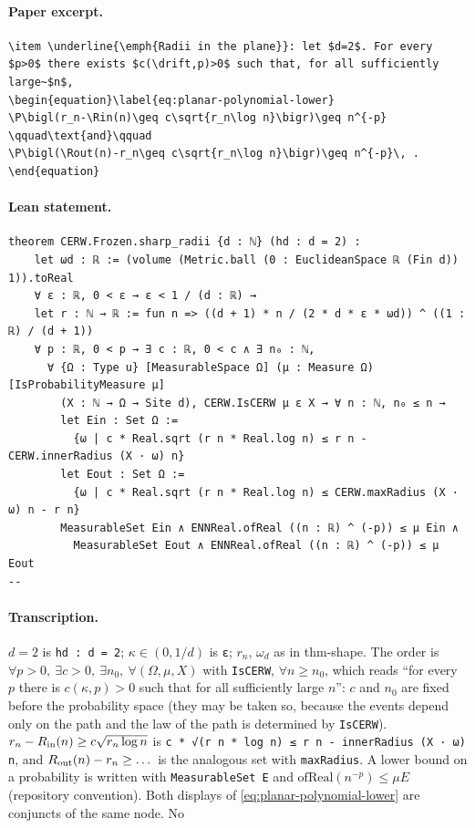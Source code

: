 \paragraph{Paper excerpt.}
\begin{verbatim}
\item \underline{\emph{Radii in the plane}}: let $d=2$. For every $p>0$ there exists $c(\drift,p)>0$ such that, for all sufficiently large~$n$,
\begin{equation}\label{eq:planar-polynomial-lower}
\P\bigl(r_n-\Rin(n)\geq c\sqrt{r_n\log n}\bigr)\geq n^{-p}
\qquad\text{and}\qquad
\P\bigl(\Rout(n)-r_n\geq c\sqrt{r_n\log n}\bigr)\geq n^{-p}\, .
\end{equation}
\end{verbatim}
\paragraph{Lean statement.}
\begin{verbatim}
theorem CERW.Frozen.sharp_radii {d : ℕ} (hd : d = 2) :
    let ωd : ℝ := (volume (Metric.ball (0 : EuclideanSpace ℝ (Fin d)) 1)).toReal
    ∀ ε : ℝ, 0 < ε → ε < 1 / (d : ℝ) →
    let r : ℕ → ℝ := fun n => ((d + 1) * n / (2 * d * ε * ωd)) ^ ((1 : ℝ) / (d + 1))
    ∀ p : ℝ, 0 < p → ∃ c : ℝ, 0 < c ∧ ∃ n₀ : ℕ,
      ∀ {Ω : Type u} [MeasurableSpace Ω] (μ : Measure Ω) [IsProbabilityMeasure μ]
        (X : ℕ → Ω → Site d), CERW.IsCERW μ ε X → ∀ n : ℕ, n₀ ≤ n →
        let Ein : Set Ω :=
          {ω | c * Real.sqrt (r n * Real.log n) ≤ r n - CERW.innerRadius (X · ω) n}
        let Eout : Set Ω :=
          {ω | c * Real.sqrt (r n * Real.log n) ≤ CERW.maxRadius (X · ω) n - r n}
        MeasurableSet Ein ∧ ENNReal.ofReal ((n : ℝ) ^ (-p)) ≤ μ Ein ∧
          MeasurableSet Eout ∧ ENNReal.ofReal ((n : ℝ) ^ (-p)) ≤ μ Eout
--
\end{verbatim}
\paragraph{Transcription.}
$d=2$ is \texttt{hd : d = 2}; $\kappa\in(0,1/d)$ is \texttt{ε}; $r_n$, $\omega_d$ as in thm-shape. The order is $\forall p>0,\ \exists c>0,\ \exists n_0,\ \forall(\Omega,\mu,X)$ with \texttt{IsCERW}, $\forall n\ge n_0$, which reads ``for every $p$ there is $c(\kappa,p)>0$ such that for all sufficiently large $n$'': $c$ and $n_0$ are fixed before the probability space (they may be taken so, because the events depend only on the path and the law of the path is determined by \texttt{IsCERW}). $r_n-R_{\rm in}(n)\ge c\sqrt{r_n\log n}$ is \texttt{c * √(r n * log n) ≤ r n - innerRadius (X · ω) n}, and $R_{\rm out}(n)-r_n\ge\dots$ is the analogous set with \texttt{maxRadius}. A lower bound on a probability is written with \texttt{MeasurableSet E} and $\mathrm{ofReal}(n^{-p})\le\mu E$ (repository convention). Both displays of \eqref{eq:planar-polynomial-lower} are conjuncts of the same node. No
